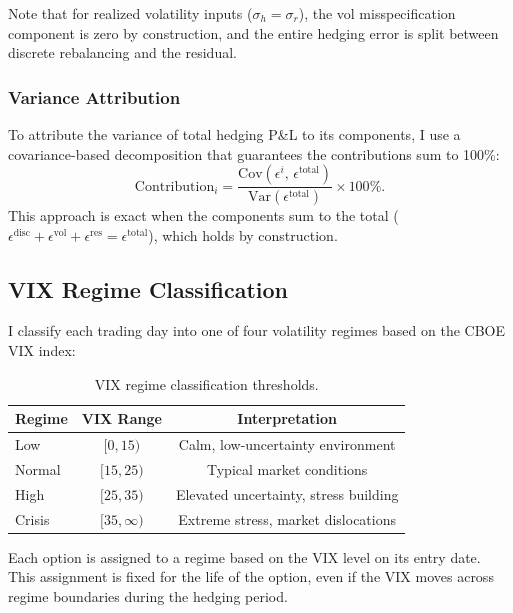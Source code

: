 \documentclass[12pt, letterpaper]{article}
\newcommand{\Var}{\text{Var}}
\newcommand{\Cov}{\text{Cov}}
\begin{document}
Note that for realized volatility inputs ($\sigma_h = \sigma_r$), the vol misspecification component is zero by construction, and the entire hedging error is split between discrete rebalancing and the residual.

\subsubsection{Variance Attribution}

To attribute the variance of total hedging P\&L to its components, I use a covariance-based decomposition that guarantees the contributions sum to 100\%:
\begin{equation}
    \text{Contribution}_i = \frac{\Cov(\epsilon^i, \, \epsilon^{\text{total}})}{\Var(\epsilon^{\text{total}})} \times 100\%.
    \label{eq:cov_decomp}
\end{equation}
This approach is exact when the components sum to the total ($\epsilon^{\text{disc}} + \epsilon^{\text{vol}} + \epsilon^{\text{res}} = \epsilon^{\text{total}}$), which holds by construction.

\subsection{VIX Regime Classification}
\label{sec:regimes}

I classify each trading day into one of four volatility regimes based on the CBOE VIX index:

\begin{table}[H]
\centering
\caption{VIX regime classification thresholds.}
\label{tab:vix_thresholds}
\begin{tabular}{lcc}
\toprule
Regime & VIX Range & Interpretation \\
\midrule
Low     & $[0, 15)$    & Calm, low-uncertainty environment \\
Normal  & $[15, 25)$   & Typical market conditions \\
High    & $[25, 35)$   & Elevated uncertainty, stress building \\
Crisis  & $[35, \infty)$ & Extreme stress, market dislocations \\
\bottomrule
\end{tabular}
\end{table}

Each option is assigned to a regime based on the VIX level on its entry date. This assignment is fixed for the life of the option, even if the VIX moves across regime boundaries during the hedging period.
\end{document}
